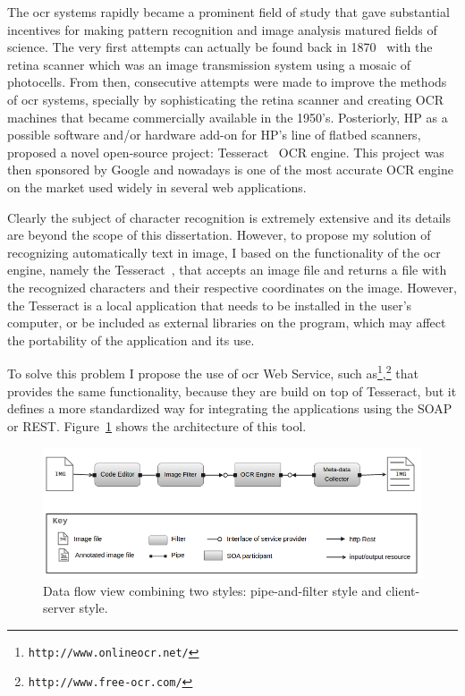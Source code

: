 The \gls{ocr} systems rapidly became a prominent field of study that gave substantial incentives for making pattern recognition and image analysis matured fields of science. The very first attempts can actually be found back in 1870~\citep{eikvil1993optical} with the retina scanner which was an image transmission system using a mosaic of photocells. From then, consecutive attempts were made to improve the methods of \gls{ocr} systems, specially by sophisticating the retina scanner and creating OCR machines that became commercially available in the 1950's. Posteriorly, HP as a possible software and/or hardware add-on for HP's line of flatbed scanners, proposed a novel open-source project: Tesseract~\citep{smith2007overview} OCR engine. This project was then sponsored by Google and nowadays is one of the most accurate OCR engine on the market used widely in several web applications.

Clearly the subject of character recognition is extremely extensive and its details are beyond the scope of this dissertation. However, to propose my solution of recognizing automatically text in image, I based on the functionality of the \gls{ocr} engine, namely the Tesseract~\citep{smith2007overview}, that accepts an image file and returns a file with the recognized characters and their respective coordinates on the image. However, the Tesseract is a local application that needs to be installed in the user's computer, or be included as external libraries on the program, which may affect the portability of the application and its use.

To solve this problem I propose the use of \gls{ocr} Web Service, such as\footnote{\texttt{http://www.onlineocr.net/}},\footnote{\texttt{http://www.free-ocr.com/}} that provides the same functionality, because they are build on top of Tesseract, but it defines a more standardized way for integrating the applications using the SOAP or REST. Figure~\ref{fig:sc-tool-arch} shows the architecture of this tool. 


\begin{figure}[!htbp]
  \centering
  \includegraphics[width=.7\textwidth]{images/sc-tool-architecture}
    \caption{Data flow view combining two styles: pipe-and-filter style and client-server style.}
  \label{fig:sc-tool-arch}
\end{figure}